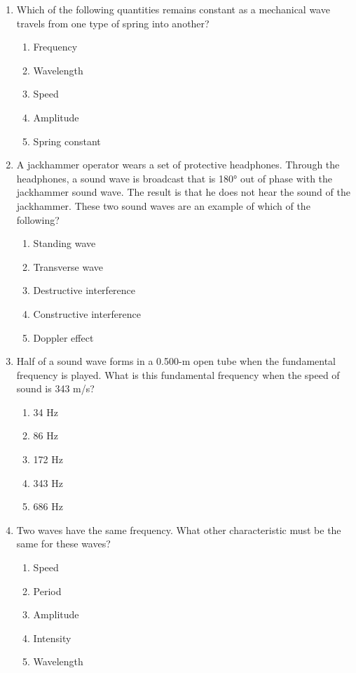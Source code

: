 \documentclass{../../../oss-apphys}
\begin{document}
\begin{multicols}{2}
\begin{enumerate}[leftmargin=18pt]
  \item Which of the following quantities remains constant as a mechanical
    wave travels from one type of spring into another?
    \begin{enumerate}[noitemsep,topsep=0pt,leftmargin=18pt,label=(\Alph*)]
    \item Frequency
    \item Wavelength
    \item Speed
    \item Amplitude
    \item Spring constant
    \end{enumerate}
    \columnbreak
    
  \item A jackhammer operator wears a set of protective headphones. Through the
    headphones, a sound wave is broadcast that is \ang{180} out of phase with
    the jackhammer sound wave. The result is that he does not hear the sound of
    the jackhammer. These two sound waves are an example of which of the
    following?
    \begin{enumerate}[noitemsep,topsep=0pt,leftmargin=18pt,label=(\Alph*)]
    \item Standing wave
    \item Transverse wave
    \item Destructive interference
    \item Constructive interference
    \item Doppler effect
    \end{enumerate}
    
  \item Half of a sound wave forms in a 0.500-m open tube when the
    fundamental frequency is played. What is this fundamental frequency
    when the speed of sound is 343 m/s?
    \begin{enumerate}[noitemsep,topsep=0pt,leftmargin=18pt,label=(\Alph*)]
    \item 34 Hz
    \item 86 Hz
    \item 172 Hz
    \item 343 Hz
    \item 686 Hz
    \end{enumerate}

  \item Two waves have the same frequency. What other characteristic must be
    the same for these waves?
    \begin{enumerate}[noitemsep,topsep=0pt,leftmargin=18pt,label=(\Alph*)]
    \item Speed
    \item Period
    \item Amplitude
    \item Intensity
    \item Wavelength
    \end{enumerate}


\end{enumerate}
\end{multicols}
\end{document}
